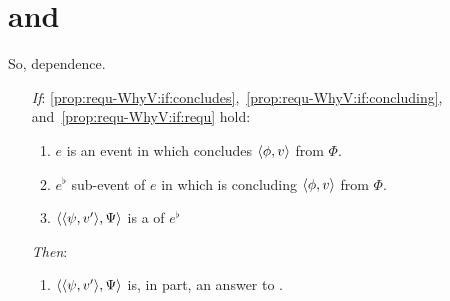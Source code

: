 \section{ and \qWhyV{}}
\label{cha:binding:sec:requ-qWhyV}

\begin{note}
  \questionWhyV*

  So, dependence.

  \begin{proposition}
    \label{prop:requ-WhyV}

    \begin{itemize}
    \item[\emph{If}:]
      \ref{prop:requ-WhyV:if:concludes},~\ref{prop:requ-WhyV:if:concluding}, and~\ref{prop:requ-WhyV:if:requ} hold:
      \begin{enumerate}[label=\alph*., ref=(\alph*), series=propRequWhyVSeries]
      \item
        \label{prop:requ-WhyV:if:concludes}
        \(e\) is an event in which \vAgent{} concludes \(\langle \phi, v \rangle\) from \(\Phi\).
      \item
        \label{prop:requ-WhyV:if:concluding}
        \(e^{\flat}\) sub-event of \(e\) in which \vAgent{} is concluding \(\langle \phi, v \rangle\) from \(\Phi\).
      \item
        \label{prop:requ-WhyV:if:requ}
        \(\langle \langle \psi, v' \rangle, \Psi \rangle\) is a \requ{} of \(e^{\flat}\)
      \end{enumerate}
    \item[\emph{Then}:]
      \begin{enumerate}[label=\alph*., ref=(\alph*), resume*=propRequWhyVSeries]
      \item
        \label{prop:requ-WhyV:tn:answer}
        \(\langle \langle \psi, v' \rangle, \Psi \rangle\) is, in part, an answer to \qWhyV{}.
      \end{enumerate}
    \end{itemize}
    \vspace{-\baselineskip}
  \end{proposition}


\end{note}
